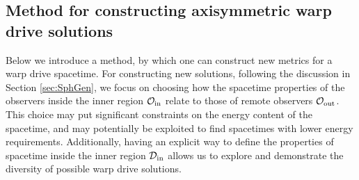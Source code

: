 \documentclass[10pt]{iopart}
\begin{document}
\subsection{Method for constructing axisymmetric warp drive solutions}
\label{sec:AxiClasses}

Below we introduce a method, by which one can construct new metrics for  a warp drive spacetime. For constructing new solutions, following the discussion in Section \ref{sec:SphGen}, we focus on choosing how the spacetime properties of the observers inside the inner region $\mathcal{O}_{\rm in}$ relate to those of remote observers $\mathcal{O}_{\rm out}$. This choice may put significant constraints on the energy content of the spacetime, and may potentially be exploited to find spacetimes with lower energy requirements. Additionally, having an explicit way to define the properties of spacetime inside the inner region $\mathcal{D}_{\rm in}$ allows us to explore and demonstrate the diversity of possible warp drive solutions.
\end{document}
